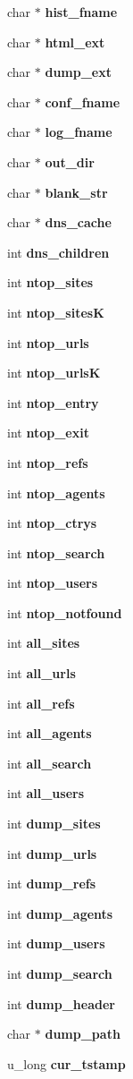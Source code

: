\begin{CompactItemize}
\item 
char $\ast$ {\bf hist\_\-fname}
\item 
char $\ast$ {\bf html\_\-ext}
\item 
char $\ast$ {\bf dump\_\-ext}
\item 
char $\ast$ {\bf conf\_\-fname}
\item 
char $\ast$ {\bf log\_\-fname}
\item 
char $\ast$ {\bf out\_\-dir}
\item 
char $\ast$ {\bf blank\_\-str}
\item 
char $\ast$ {\bf dns\_\-cache}
\item 
int {\bf dns\_\-children}
\item 
int {\bf ntop\_\-sites}
\item 
int {\bf ntop\_\-sites\-K}
\item 
int {\bf ntop\_\-urls}
\item 
int {\bf ntop\_\-urls\-K}
\item 
int {\bf ntop\_\-entry}
\item 
int {\bf ntop\_\-exit}
\item 
int {\bf ntop\_\-refs}
\item 
int {\bf ntop\_\-agents}
\item 
int {\bf ntop\_\-ctrys}
\item 
int {\bf ntop\_\-search}
\item 
int {\bf ntop\_\-users}
\item 
int {\bf ntop\_\-notfound}
\item 
int {\bf all\_\-sites}
\item 
int {\bf all\_\-urls}
\item 
int {\bf all\_\-refs}
\item 
int {\bf all\_\-agents}
\item 
int {\bf all\_\-search}
\item 
int {\bf all\_\-users}
\item 
int {\bf dump\_\-sites}
\item 
int {\bf dump\_\-urls}
\item 
int {\bf dump\_\-refs}
\item 
int {\bf dump\_\-agents}
\item 
int {\bf dump\_\-users}
\item 
int {\bf dump\_\-search}
\item 
int {\bf dump\_\-header}
\item 
char $\ast$ {\bf dump\_\-path}
\item 
u\_\-long {\bf cur\_\-tstamp}

\end{CompactItemize}
